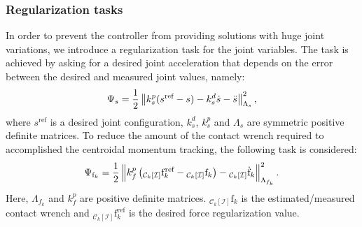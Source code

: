 \subsubsection{Regularization tasks}
In order to prevent the controller from providing solutions with huge joint variations, we introduce a regularization task for the joint variables. The task is achieved by asking for a desired joint acceleration that depends on the error between the desired and measured joint values, namely:
\begin{equation}
    \Psi_s = \frac{1}{2} \left\lVert k_s^p(s^\text{ref} -s) - k_s^d \dot{s} - \ddot{s}\right\rVert^2  _ {\Lambda _ s},
\end{equation}
where $s^\text{ref}$ is a desired joint configuration, $k_s^d$, $k_s^p$ and $\Lambda _ s$ are symmetric positive definite matrices. 
To reduce the amount of the contact wrench required to accomplished the centroidal momentum tracking, the following task is considered:
\begin{equation}
    \Psi_{\mathrm{f}_k} = \frac{1}{2} \left\lVert k_f^p\left({}_{\mathcal{C}_k[\mathcal{I}]}\mathrm{f}_k^\text{ref} -{}_{\mathcal{C}_k[\mathcal{I}]}\mathrm{f}_k\right) - {}_{\mathcal{C}_k[\mathcal{I}]}\dot{\mathrm{f}}_k\right\rVert^2  _ {\Lambda _ {f_k}}.
\end{equation}
Here, $\Lambda _ {f_k}$ and $k_f^p$ are positive definite matrices. ${}_{\mathcal{C}_k[\mathcal{I}]}\mathrm{f}_k$ is the estimated/measured contact wrench and ${}_{\mathcal{C}_k[\mathcal{I}]}\mathrm{f}^\text{ref}_k$ is the desired force regularization value.
